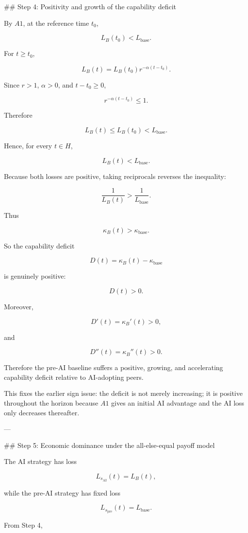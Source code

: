 ## Step 4: Positivity and growth of the capability deficit

By \(A1\), at the reference time \(t_0\),

\[
L_B(t_0)<L_{\mathrm{base}}.
\]

For \(t\geq t_0\),

\[
L_B(t)
=
L_B(t_0)r^{-\alpha(t-t_0)}.
\]

Since \(r>1\), \(\alpha>0\), and \(t-t_0\geq 0\),

\[
r^{-\alpha(t-t_0)}\leq 1.
\]

Therefore

\[
L_B(t)\leq L_B(t_0)<L_{\mathrm{base}}.
\]

Hence, for every \(t\in H\),

\[
L_B(t)<L_{\mathrm{base}}.
\]

Because both losses are positive, taking reciprocals reverses the inequality:

\[
\frac{1}{L_B(t)}>\frac{1}{L_{\mathrm{base}}}.
\]

Thus

\[
\kappa_B(t)>\kappa_{\mathrm{base}}.
\]

So the capability deficit

\[
D(t)=\kappa_B(t)-\kappa_{\mathrm{base}}
\]

is genuinely positive:

\[
D(t)>0.
\]

Moreover,

\[
D'(t)=\kappa_B'(t)>0,
\]

and

\[
D''(t)=\kappa_B''(t)>0.
\]

Therefore the pre-AI baseline suffers a positive, growing, and accelerating capability deficit relative to AI-adopting peers.

This fixes the earlier sign issue: the deficit is not merely increasing; it is positive throughout the horizon because \(A1\) gives an initial AI advantage and the AI loss only decreases thereafter.

---

## Step 5: Economic dominance under the all-else-equal payoff model

The AI strategy has loss

\[
L_{s_{\mathrm{AI}}}(t)=L_B(t),
\]

while the pre-AI strategy has fixed loss

\[
L_{s_{\mathrm{pre}}}(t)=L_{\mathrm{base}}.
\]

From Step 4,


